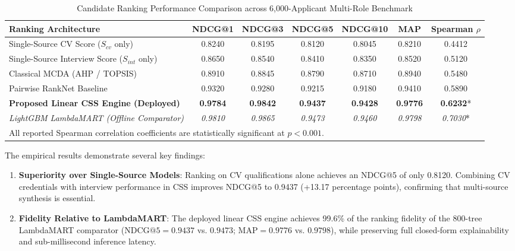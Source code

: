 \documentclass[conference]{IEEEtran}
\begin{document}
\begin{table}[t]
\centering
\caption{Candidate Ranking Performance Comparison across 6,000-Applicant Multi-Role Benchmark}
\label{tab:c3_ranking_comp}
\begin{tabular}{@{}lcccccc@{}}
\toprule
\textbf{Ranking Architecture} & \textbf{NDCG@1} & \textbf{NDCG@3} & \textbf{NDCG@5} & \textbf{NDCG@10} & \textbf{MAP} & \textbf{Spearman $\rho$} \\
\midrule
Single-Source CV Score ($S_{cv}$ only) & 0.8240 & 0.8195 & 0.8120 & 0.8045 & 0.8210 & 0.4412 \\
Single-Source Interview Score ($S_{int}$ only) & 0.8650 & 0.8540 & 0.8410 & 0.8350 & 0.8520 & 0.5120 \\
Classical MCDA (AHP / TOPSIS) & 0.8910 & 0.8845 & 0.8790 & 0.8710 & 0.8940 & 0.5480 \\
Pairwise RankNet Baseline & 0.9320 & 0.9280 & 0.9215 & 0.9180 & 0.9410 & 0.5890 \\
\textbf{Proposed Linear CSS Engine (Deployed)} & \textbf{0.9784} & \textbf{0.9842} & \textbf{0.9437} & \textbf{0.9428} & \textbf{0.9776} & \textbf{0.6232}* \\
\midrule
\textit{LightGBM LambdaMART (Offline Comparator)} & \textit{0.9810} & \textit{0.9865} & \textit{0.9473} & \textit{0.9460} & \textit{0.9798} & \textit{0.7030}* \\
\bottomrule
\multicolumn{7}{l}{\footnotesize *All reported Spearman correlation coefficients are statistically significant at $p < 0.001$.}
\end{tabular}
\end{table}

The empirical results demonstrate several key findings:
\begin{enumerate}
    \item \textbf{Superiority over Single-Source Models}: Ranking on CV qualifications alone achieves an NDCG@5 of only 0.8120. Combining CV credentials with interview performance in CSS improves NDCG@5 to 0.9437 (+13.17 percentage points), confirming that multi-source synthesis is essential.
    \item \textbf{Fidelity Relative to LambdaMART}: The deployed linear CSS engine achieves 99.6\% of the ranking fidelity of the 800-tree LambdaMART comparator ($\text{NDCG@5} = 0.9437$ vs. $0.9473$; $\text{MAP} = 0.9776$ vs. $0.9798$), while preserving full closed-form explainability and sub-millisecond inference latency.
\end{enumerate}
\end{document}
